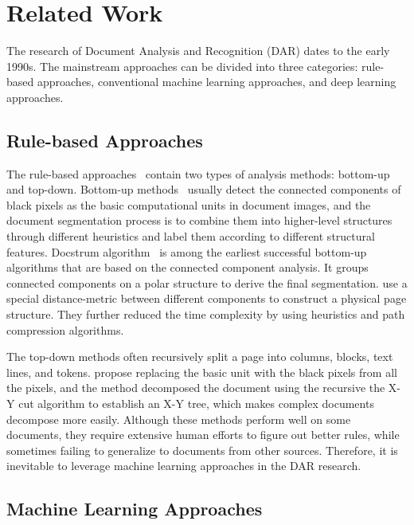 \documentclass[sigconf]{acmart}
\begin{document}
\section{Related Work}

The research of Document Analysis and Recognition (DAR) dates to the early 1990s. The mainstream approaches can be divided into three categories: rule-based approaches, conventional machine learning approaches, and deep learning approaches.

\subsection{Rule-based Approaches}

The rule-based approaches~\citep{lebourgeois1992fast, 244677, ha1995recursive, simon1997fast} contain two types of analysis methods: bottom-up and top-down. Bottom-up methods~\citep{lebourgeois1992fast, ha1995document, simon1997fast} usually detect the connected components of black pixels as the basic computational units in document images, and the document segmentation process is to combine them into higher-level structures through different heuristics and label them according to different structural features. Docstrum algorithm~\citep{244677} is among the earliest successful bottom-up algorithms that are based on the connected component analysis. It groups connected components on a polar structure to derive the final segmentation. \cite{simon1997fast} use a special distance-metric between different components to construct a physical page structure. They further reduced the time complexity by using heuristics and path compression algorithms.

The top-down methods often recursively split a page into columns, blocks, text lines, and tokens. \cite{ha1995recursive} propose replacing the basic unit with the black pixels from all the pixels, and the method decomposed the document using the recursive the X-Y cut algorithm to establish an X-Y tree, which makes complex documents decompose more easily. Although these methods perform well on some documents, they require extensive human efforts to figure out better rules, while sometimes failing to generalize to documents from other sources. Therefore, it is inevitable to leverage machine learning approaches in the DAR research.

\subsection{Machine Learning Approaches}
\end{document}
